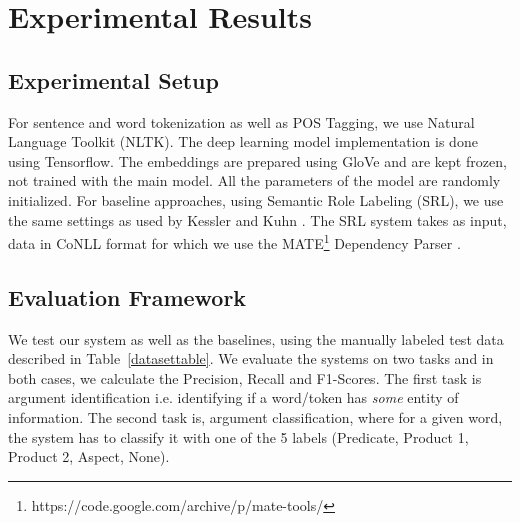 \section{Experimental Results}

\subsection{Experimental Setup}
For sentence and word tokenization as well as POS Tagging, we use Natural Language Toolkit (NLTK). The deep learning model implementation is done using Tensorflow. The embeddings are prepared using GloVe and are kept frozen, not trained with the main model. All the parameters of the model are randomly initialized. For baseline approaches, using Semantic Role Labeling (SRL), we use the same settings as used by Kessler and Kuhn \cite{kessler2013detection}. The SRL system takes as input, data in CoNLL format for which we use the MATE\footnote{https://code.google.com/archive/p/mate-tools/} Dependency Parser \cite{bohnet2010very}.

\subsection{Evaluation Framework}
We test our system as well as the baselines, using the manually labeled test data described in Table~\ref{datasettable}. We evaluate the systems on two tasks and in both cases, we calculate the Precision, Recall and F1-Scores. The first task is argument identification i.e. identifying if a word/token has \emph{some} entity of information. The second task is, argument classification, where for a given word, the system has to classify it with one of the 5 labels (Predicate, Product 1, Product 2, Aspect, None).

